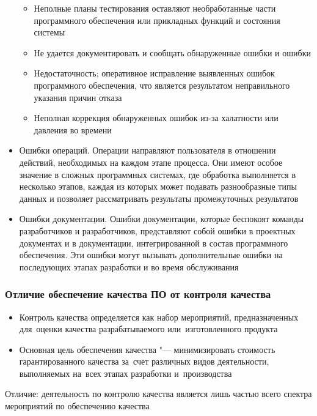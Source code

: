 \documentclass{../industrial-development}
\begin{document}
\begin{itemize}
		\begin{itemize}
	\item Неполные планы тестирования оставляют необработанные части программного обеспечения или прикладных функций и состояния системы
	\item Не удается документировать и сообщать обнаруженные ошибки и ошибки
	\item Недостаточность; оперативное исправление выявленных ошибок программного обеспечения, что является результатом неправильного указания причин отказа
	\item Неполная коррекция обнаруженных ошибок из-за халатности или давления во времени
  		\end{itemize}
\item Ошибки операций. Операции направляют пользователя в отношении действий, необходимых на каждом этапе процесса. Они имеют особое значение в сложных программных системах, где обработка выполняется в несколько этапов, каждая из которых может подавать разнообразные типы данных и позволяет рассматривать результаты промежуточных результатов
\item Ошибки документации. Ошибки документации, которые беспокоят команды разработчиков и разработчиков, представляют собой ошибки в проектных документах и в документации, интегрированной в состав программного обеспечения. Эти ошибки могут вызывать дополнительные ошибки на последующих этапах разработки и во время обслуживания~\cite[с.~19--23]{SQA-Galin}
  	\end{itemize}



\begin{frame} \frametitle{Отличие обеспечение качества ПО от контроля качества}
 	 \begin{itemize}
\item Контроль качества определяется как набор мероприятий, предназначенных для~оценки качества разрабатываемого или~изготовленного продукта
\item Основная цель обеспечения качества "--- минимизировать стоимость гарантированного качества за~счет различных видов деятельности, выполняемых на~всех этапах разработки и~производства
  	\end{itemize}
Отличие: деятельность по контролю качества является лишь частью всего спектра мероприятий по обеспечению качества
\end{frame}


\lecturenotes
\end{document}

